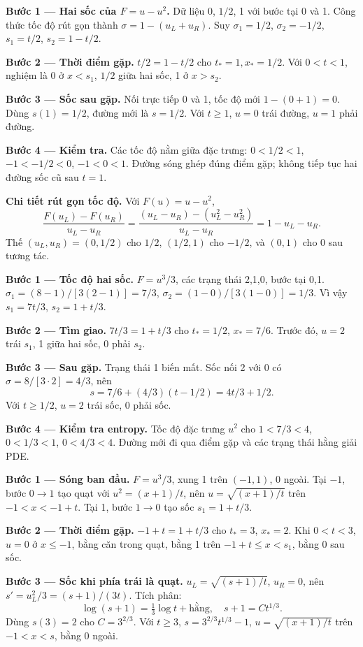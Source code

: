 \textbf{Bước 1 — Hai sốc của $F=u-u^2$.} Dữ liệu 0, $1/2$, 1 với bước tại 0 và 1. Công thức tốc độ rút gọn thành $\sigma=1-(u_L+u_R)$. Suy $\sigma_1=1/2$, $\sigma_2=-1/2$, $s_1=t/2$, $s_2=1-t/2$.

\textbf{Bước 2 — Thời điểm gặp.} $t/2=1-t/2$ cho $t_*=1,x_*=1/2$. Với $0<t<1$, nghiệm là 0 ở $x<s_1$, $1/2$ giữa hai sốc, 1 ở $x>s_2$.

\textbf{Bước 3 — Sốc sau gặp.} Nối trực tiếp 0 và 1, tốc độ mới $1-(0+1)=0$. Dùng $s(1)=1/2$, đường mới là $s=1/2$. Với $t\ge1$, $u=0$ trái đường, $u=1$ phải đường.

\textbf{Bước 4 — Kiểm tra.} Các tốc độ nằm giữa đặc trưng: $0<1/2<1$, $-1<-1/2<0$, $-1<0<1$. Đường sóng ghép đúng điểm gặp; không tiếp tục hai đường sốc cũ sau $t=1$.

\textbf{Chi tiết rút gọn tốc độ.} Với $F(u)=u-u^2$,
\[\frac{F(u_L)-F(u_R)}{u_L-u_R}
=\frac{(u_L-u_R)-(u_L^2-u_R^2)}{u_L-u_R}
=1-u_L-u_R.\]
Thế $(u_L,u_R)=(0,1/2)$ cho $1/2$, $(1/2,1)$ cho $-1/2$, và $(0,1)$ cho $0$ sau tương tác.

\textbf{Bước 1 — Tốc độ hai sốc.} $F=u^3/3$, các trạng thái 2,1,0, bước tại 0,1. $\sigma_1=(8-1)/[3(2-1)]=7/3$, $\sigma_2=(1-0)/[3(1-0)]=1/3$. Vì vậy $s_1=7t/3$, $s_2=1+t/3$.

\textbf{Bước 2 — Tìm giao.} $7t/3=1+t/3$ cho $t_*=1/2$, $x_*=7/6$. Trước đó, $u=2$ trái $s_1$, 1 giữa hai sốc, 0 phải $s_2$.

\textbf{Bước 3 — Sau gặp.} Trạng thái 1 biến mất. Sốc nối 2 với 0 có $\sigma=8/[3\cdot2]=4/3$, nên
\[s=7/6+(4/3)(t-1/2)=4t/3+1/2.\]
Với $t\ge1/2$, $u=2$ trái sốc, 0 phải sốc.

\textbf{Bước 4 — Kiểm tra entropy.} Tốc độ đặc trưng $u^2$ cho $1<7/3<4$, $0<1/3<1$, $0<4/3<4$. Đường mới đi qua điểm gặp và các trạng thái hằng giải PDE.

\textbf{Bước 1 — Sóng ban đầu.} $F=u^3/3$, xung 1 trên $(-1,1)$, 0 ngoài. Tại $-1$, bước $0\to1$ tạo quạt với $u^2=(x+1)/t$, nên $u=\sqrt{(x+1)/t}$ trên $-1<x<-1+t$. Tại 1, bước $1\to0$ tạo sốc $s_1=1+t/3$.

\textbf{Bước 2 — Thời điểm gặp.} $-1+t=1+t/3$ cho $t_*=3$, $x_*=2$. Khi $0<t<3$, $u=0$ ở $x\le-1$, bằng căn trong quạt, bằng 1 trên $-1+t\le x<s_1$, bằng 0 sau sốc.

\textbf{Bước 3 — Sốc khi phía trái là quạt.} $u_L=\sqrt{(s+1)/t}$, $u_R=0$, nên $s'=u_L^2/3=(s+1)/(3t)$. Tích phân:
\[\log(s+1)=\tfrac13\log t+\text{hằng},\quad s+1=Ct^{1/3}.\]
Dùng $s(3)=2$ cho $C=3^{2/3}$. Với $t\ge3$, $s=3^{2/3}t^{1/3}-1$, $u=\sqrt{(x+1)/t}$ trên $-1<x<s$, bằng 0 ngoài.

